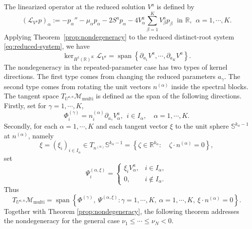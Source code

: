 \documentclass[11pt]{article}
\numberwithin{equation}{section}
\newcommand{\R}{{\mathbb{R}}}
\theoremstyle{definition}
\begin{document}
The linearized operator at the reduced solution $V^a$ is  defined by
\begin{equation}\label{eq:multi-LV}
(\mathcal L_{V^a}p)_\alpha
:=
-p_\alpha''
-\mu_\alpha p_\alpha
-2S^{a}p_\alpha
-4V_\alpha^a\sum_{\beta=1}^K V_\beta^a p_\beta\ \ \,\mbox{in} \,\ \R,
\ \  \alpha=1,\cdots,K.
\end{equation}
Applying Theorem~\ref{prop:nondegeneracy}
to the reduced distinct-root system \eqref{eq:reduced-system}, we have
\begin{equation}\label{eq:reduced-nondeg}
\ker_{H^1(\mathbb R)^K}\mathcal L_{V^a}
=
\operatorname{span}
\left\{
\partial_{a_1}V^a,\cdots,\partial_{a_K}V^a
\right\}.
\end{equation}
The nondegeneracy  in the repeated-parameter case has two types
of kernel directions.  The first type comes from changing the reduced
parameters \(a_\gamma\).  The second type comes from rotating the unit
vectors \(n^{(\alpha)}\) inside the spectral blocks.
The tangent space $T_{U^{a,n}}\mathcal M_{\mathrm{multi}}$ is defined as the span of the
following directions. Firstly, set for $\gamma=1,\cdots,K$,
\begin{equation}\label{eq:tangent-a-direction}
\Phi_i^{(\gamma)}
=
n_i^{(\alpha)}\partial_{a_\gamma}V_\alpha^a,
\ \
i\in I_\alpha,\quad \alpha=1,\cdots,K.
\end{equation}
Secondly, for each $\alpha=1,\cdots,K$ and each tangent vector
$\xi$ to the unit sphere $\mathbb S^{k_\alpha-1}$ at $n^{(\alpha)}$, namely
\[
\xi=(\xi_i)_{i\in I_\alpha}\in T_{n^{(\alpha)}}\mathbb S^{k_\alpha-1}
=
\left\{\zeta\in\mathbb R^{k_\alpha}:\quad\zeta\cdot n^{(\alpha)}=0\right\},
\]
set
\begin{equation}\label{eq:tangent-rotation-direction}
\Psi_i^{(\alpha,\xi)}
=
\begin{cases}
	\xi_i V_\alpha^a, & i\in I_\alpha,\\
	0, & i\notin I_\alpha.
\end{cases}
\end{equation}
Thus
\begin{equation}\label{eq:tangent-space}
T_{U^{a,n}}\mathcal M_{\mathrm{multi}}
=
\operatorname{span}
\left\{
\Phi^{(\gamma)},\ \Psi^{(\alpha,\xi)}:
\gamma=1,\cdots,K,\
\alpha=1,\cdots,K,\
\xi\cdot n^{(\alpha)}=0
\right\}.
\end{equation}
Together with Theorem \ref{prop:nondegeneracy}, the following theorem addresses the  nondegeneracy  for the general case  $\nu_1\le\cdots\le\nu_N<0$.
\end{document}
